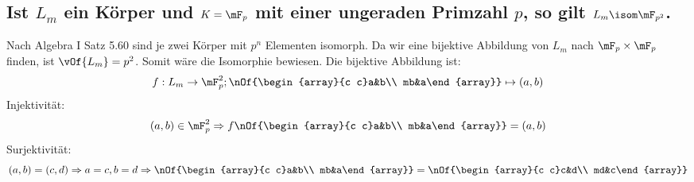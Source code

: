 \subsection{Ist $L_m$ ein Körper und $K=\mF_p$ mit einer ungeraden Primzahl $p$, so gilt $L_m \isom \mF_{p^2}$.} Nach Algebra I Satz 5.60 sind je zwei Körper mit $p^n$ Elementen isomorph. Da wir eine bijektive Abbildung von $L_m$ nach $\mF_p\times\mF_p$ finden, ist $\vOf{L_m} = p^2$. Somit wäre die Isomorphie bewiesen. Die bijektive Abbildung ist:
\begin{equation}
	f: L_m \to \mF_p^2; \nOf{\begin{array}{c c}a&b\\ mb&a\end{array}} \mapsto (a,b)
\end{equation}
Injektivität:
\begin{equation}
	(a,b) \in \mF_p^2 \Rightarrow f\nOf{\begin{array}{c c}a&b\\ mb&a\end{array}} = (a,b)
\end{equation}
Surjektivität:
\begin{equation}
	(a,b) = (c,d) \Rightarrow a=c,b=d \Rightarrow \nOf{\begin{array}{c c}a&b\\ mb&a\end{array}} = \nOf{\begin{array}{c c}c&d\\ md&c\end{array}}
\end{equation}
